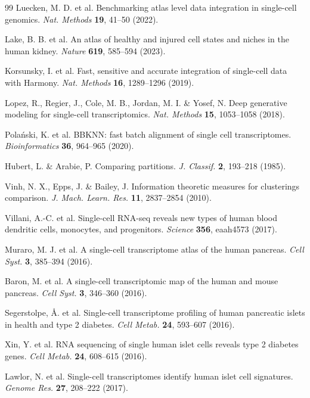 \documentclass[11pt]{article}
\begin{document}
\begin{thebibliography}{99}
Luecken, M. D. et al. Benchmarking atlas level data integration in single-cell genomics. \textit{Nat. Methods} \textbf{19}, 41--50 (2022).

Lake, B. B. et al. An atlas of healthy and injured cell states and niches in the human kidney. \textit{Nature} \textbf{619}, 585--594 (2023).

Korsunsky, I. et al. Fast, sensitive and accurate integration of single-cell data with Harmony. \textit{Nat. Methods} \textbf{16}, 1289--1296 (2019).

Lopez, R., Regier, J., Cole, M. B., Jordan, M. I. \& Yosef, N. Deep generative modeling for single-cell transcriptomics. \textit{Nat. Methods} \textbf{15}, 1053--1058 (2018).

Pola\'nski, K. et al. BBKNN: fast batch alignment of single cell transcriptomes. \textit{Bioinformatics} \textbf{36}, 964--965 (2020).

Hubert, L. \& Arabie, P. Comparing partitions. \textit{J. Classif.} \textbf{2}, 193--218 (1985).

Vinh, N. X., Epps, J. \& Bailey, J. Information theoretic measures for clusterings comparison. \textit{J. Mach. Learn. Res.} \textbf{11}, 2837--2854 (2010).

Villani, A.-C. et al. Single-cell RNA-seq reveals new types of human blood dendritic cells, monocytes, and progenitors. \textit{Science} \textbf{356}, eaah4573 (2017).

Muraro, M. J. et al. A single-cell transcriptome atlas of the human pancreas. \textit{Cell Syst.} \textbf{3}, 385--394 (2016).

Baron, M. et al. A single-cell transcriptomic map of the human and mouse pancreas. \textit{Cell Syst.} \textbf{3}, 346--360 (2016).

Segerstolpe, \AA. et al. Single-cell transcriptome profiling of human pancreatic islets in health and type 2 diabetes. \textit{Cell Metab.} \textbf{24}, 593--607 (2016).

Xin, Y. et al. RNA sequencing of single human islet cells reveals type 2 diabetes genes. \textit{Cell Metab.} \textbf{24}, 608--615 (2016).

Lawlor, N. et al. Single-cell transcriptomes identify human islet cell signatures. \textit{Genome Res.} \textbf{27}, 208--222 (2017).


\end{thebibliography}
\end{document}
